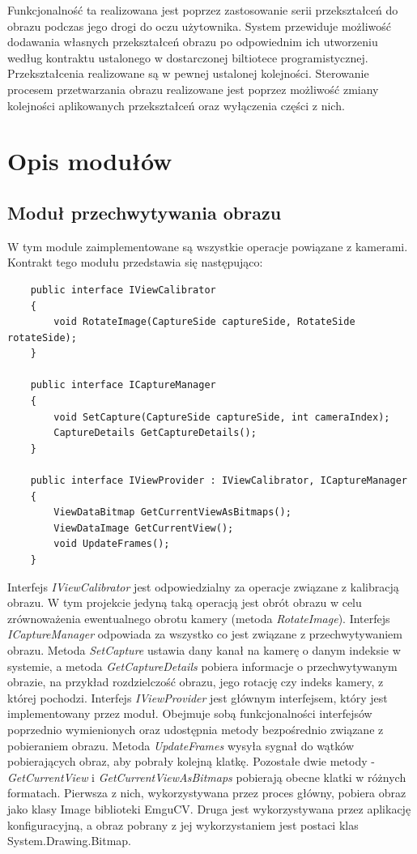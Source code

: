 \documentclass[a4paper,11pt,twoside]{report}
\theoremstyle{definition}
\begin{document}
Funkcjonalność ta realizowana jest poprzez zastosowanie serii przekształceń do obrazu podczas jego drogi do oczu użytownika. System przewiduje możliwość dodawania własnych przekształceń obrazu po odpowiednim ich utworzeniu według kontraktu ustalonego w dostarczonej biltiotece programistycznej. Przekształcenia realizowane są w pewnej ustalonej kolejności. Sterowanie procesem przetwarzania obrazu realizowane jest poprzez możliwość zmiany kolejności aplikowanych przekształceń oraz wyłączenia części z nich.

\section {Opis modułów}


\subsection {Moduł przechwytywania obrazu}

W tym module zaimplementowane są wszystkie operacje powiązane z kamerami. Kontrakt tego modułu przedstawia się następująco:

\lstset{style=sharpc}
\begin{lstlisting}
    public interface IViewCalibrator
    {
        void RotateImage(CaptureSide captureSide, RotateSide rotateSide);
    }

    public interface ICaptureManager
    {
        void SetCapture(CaptureSide captureSide, int cameraIndex);
        CaptureDetails GetCaptureDetails();
    }

    public interface IViewProvider : IViewCalibrator, ICaptureManager
    {      
        ViewDataBitmap GetCurrentViewAsBitmaps();               
        ViewDataImage GetCurrentView();
        void UpdateFrames();
    }
\end{lstlisting}

Interfejs \textit{IViewCalibrator} jest odpowiedzialny za operacje związane z kalibracją obrazu. W tym projekcie jedyną taką operacją jest obrót obrazu w celu zrównoważenia ewentualnego obrotu kamery (metoda \textit{RotateImage}).
Interfejs \textit{ICaptureManager} odpowiada za wszystko co jest związane z przechwytywaniem obrazu. Metoda \textit{SetCapture} ustawia dany kanał na kamerę o danym indeksie w systemie, a metoda \textit{GetCaptureDetails} pobiera informacje o przechwytywanym obrazie, na przykład rozdzielczość obrazu, jego rotację czy indeks kamery, z której pochodzi.
Interfejs \textit{IViewProvider} jest głównym interfejsem, który jest implementowany przez moduł. Obejmuje sobą funkcjonalności interfejsów poprzednio wymienionych oraz udostępnia metody bezpośrednio związane z pobieraniem obrazu. Metoda \textit{UpdateFrames} wysyła sygnał do wątków pobierających obraz, aby pobrały kolejną klatkę. Pozostałe dwie metody - \textit{GetCurrentView} i \textit{GetCurrentViewAsBitmaps} pobierają obecne klatki w różnych formatach. Pierwsza z nich, wykorzystywana przez proces główny, pobiera obraz jako klasy Image biblioteki EmguCV. Druga jest wykorzystywana przez aplikację konfiguracyjną, a obraz pobrany z jej wykorzystaniem jest postaci klas System.Drawing.Bitmap.
\end{document}
